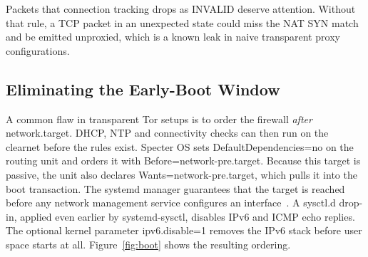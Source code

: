 \documentclass[10pt,twocolumn,a4paper]{article}
\DeclareRobustCommand{\texttt}[1]{\mbox{\ttfamily #1}}
\begin{document}
Packets that connection tracking drops as \texttt{INVALID} deserve
attention. Without that rule, a TCP packet in an unexpected state could
miss the NAT \texttt{SYN} match and be emitted unproxied, which is a
known leak in naive transparent proxy configurations.

\subsection{Eliminating the Early-Boot Window}
A common flaw in transparent Tor setups is to order the firewall
\emph{after} \texttt{network.target}. DHCP, NTP and connectivity checks
can then run on the clearnet before the rules exist. Specter OS sets
\texttt{DefaultDependencies=no} on the routing unit and orders it with
\texttt{Before=network-pre.target}. Because this target is passive, the
unit also declares \texttt{Wants=network-pre.target}, which pulls it
into the boot transaction. The \texttt{systemd} manager guarantees that
the target
is reached before any network management service configures an
interface~\cite{systemd}. A \texttt{sysctl.d} drop-in, applied even
earlier by \texttt{systemd-sysctl}, disables IPv6 and ICMP echo
replies. The optional kernel parameter \texttt{ipv6.disable=1} removes
the IPv6 stack before user space starts at all. Figure~\ref{fig:boot}
shows the resulting ordering.
\end{document}
